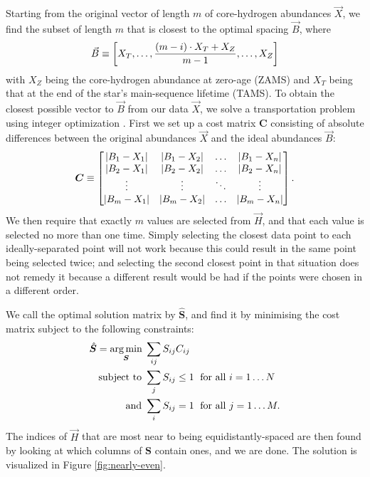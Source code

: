 \documentclass[manuscript]{aastex}
\begin{document}
Starting from the original vector of length $m$ of core-hydrogen abundances $\vec X$, we find the subset of length $m$ that is closest to the optimal spacing $\vec B$, where
\begin{equation}
  \vec B \equiv \qty[
    X_T, 
    \ldots,
    \frac{(m-i)\cdot X_T + X_Z}{m-1}, 
    \ldots, 
    X_Z
  ]
\end{equation}
with $X_Z$ being the core-hydrogen abundance at zero-age (ZAMS) and $X_T$ being that at the end of the star's main-sequence lifetime (TAMS). To obtain the closest possible vector to $\vec B$ from our data $\vec X$, we solve a transportation problem using integer optimization \citep{23145595}. First we set up a cost matrix $\boldsymbol{C}$ consisting of absolute differences between the original abundances $\vec X$ and the ideal abundances $\vec B$:
\begin{equation}
  \boldsymbol C \equiv 
  \begin{bmatrix}
    \abs{B_1-X_1} & \abs{B_1-X_2} & \dots & \abs{B_1-X_n} \\ 
    \abs{B_2-X_1} & \abs{B_2-X_2} & \dots & \abs{B_2-X_n} \\ 
    \vdots & \vdots & \ddots & \vdots\\ 
    \abs{B_m-X_1} & \abs{B_m-X_2} & \dots & \abs{B_m-X_n}
  \end{bmatrix}.
\end{equation}
We then require that exactly $m$ values are selected from $\vec H$, and that each value is selected no more than one time. Simply selecting the closest data point to each ideally-separated point will not work because this could result in the same point being selected twice; and selecting the second closest point in that situation does not remedy it because a different result would be had if the points were chosen in a different order. 

We call the optimal solution matrix by $\hat{\boldsymbol{S}}$, and find it by minimising the cost matrix subject to the following constraints:
\begin{align}
  \hat{\boldsymbol{S}} = \underset{\boldsymbol S}{\arg\min} \; & \sum_{ij} S_{ij} C_{ij} \notag\\
  \text{subject to } & \sum_j S_{ij} \leq 1 \; \text{ for all } i=1\ldots N \notag\\
  \text{and } & \sum_i S_{ij} = 1 \; \text{ for all } j=1\ldots M.
  \label{eq:optimal-spacing}
\end{align}
The indices of $\vec H$ that are most near to being equidistantly-spaced are then found by looking at which columns of $\boldsymbol S$ contain ones, and we are done. The solution is visualized in Figure \ref{fig:nearly-even}.
\end{document}
